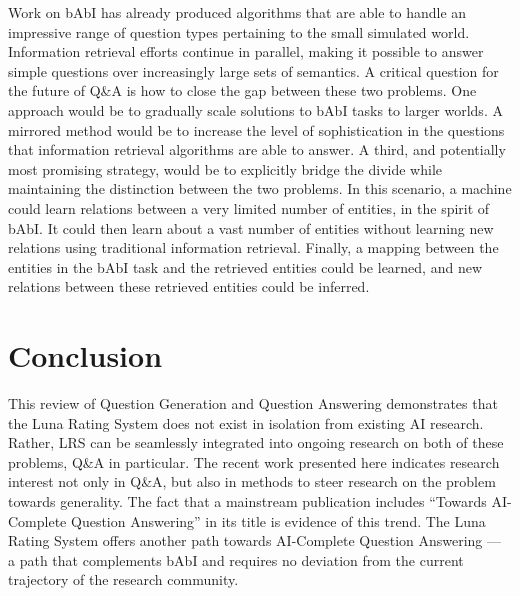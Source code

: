 Work on bAbI has already produced algorithms that are able to handle an impressive range of question types pertaining to the small simulated world. Information retrieval efforts continue in parallel, making it possible to answer simple questions over increasingly large sets of semantics. A critical question for the future of Q\&A is how to close the gap between these two problems. One approach would be to gradually scale solutions to bAbI tasks to larger worlds. A mirrored method would be to increase the level of sophistication in the questions that information retrieval algorithms are able to answer. A third, and potentially most promising strategy, would be to explicitly bridge the divide while maintaining the distinction between the two problems. In this scenario, a machine could learn relations between a very limited number of entities, in the spirit of bAbI. It could then learn about a vast number of entities without learning new relations using traditional information retrieval. Finally, a mapping between the entities in the bAbI task and the retrieved entities could be learned, and new relations between these retrieved entities could be inferred. 

\section{Conclusion}

This review of Question Generation and Question Answering demonstrates that the Luna Rating System does not exist in isolation from existing AI research. Rather, LRS can be seamlessly integrated into ongoing research on both of these problems, Q\&A in particular. The recent work presented here indicates research interest not only in Q\&A, but also in methods to steer research on the problem towards generality. The fact that a mainstream publication includes ``Towards AI-Complete Question Answering'' in its title is evidence of this trend. The Luna Rating System offers another path towards AI-Complete Question Answering --- a path that complements bAbI and requires no deviation from the current trajectory of the research community.

